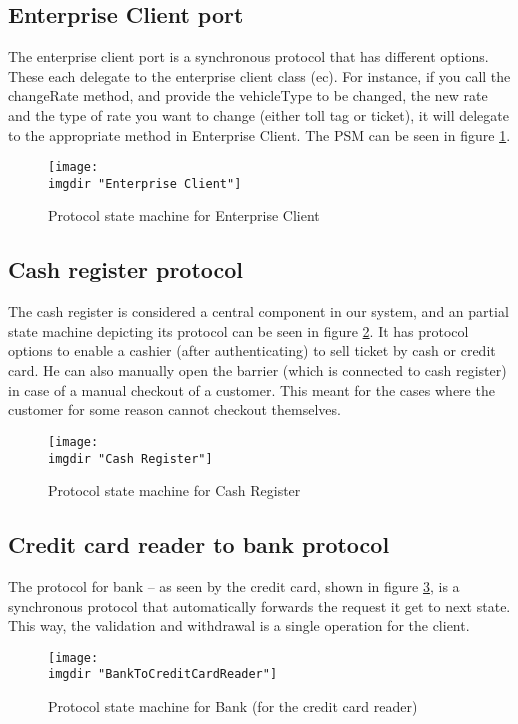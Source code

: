 \subsection{Enterprise Client port}
The enterprise client port is a synchronous protocol that has different options. These each delegate to the enterprise client class (ec). For instance, if you call the changeRate method, and provide the vehicleType to be changed, the new rate and the type of rate you want to change (either toll tag or ticket), it will delegate to the appropriate method in Enterprise Client. The PSM can be seen in figure \ref{fig:psm:enterprise_client}.
\begin{figure}
  \centering
  \texttt{[image: \\imgdir "Enterprise Client"]}
  \caption{Protocol state machine for Enterprise Client}
  \label{fig:psm:enterprise_client}
\end{figure}

\subsection{Cash register protocol}
The cash register is considered a central component in our system, and an partial state machine depicting its protocol can be seen in figure \ref{fig:psm:cash_register}. It has protocol options to enable a cashier (after authenticating) to sell ticket by cash or credit card. He can also manually open the barrier (which is connected to cash register) in case of a manual checkout of a customer. This meant for the cases where the customer for some reason cannot checkout themselves.
\begin{figure}
  \centering
  \texttt{[image: \\imgdir "Cash Register"]}
  \caption{Protocol state machine for Cash Register}
  \label{fig:psm:cash_register}
\end{figure}

\subsection{Credit card reader to bank protocol}
The protocol for bank -- as seen by the credit card, shown in figure \ref{fig:psm:ccr_to_bank}, is a synchronous protocol that automatically forwards the request it get to next state. This way, the validation and withdrawal is a single operation for the client.
\begin{figure}
  \centering
  \texttt{[image: \\imgdir "BankToCreditCardReader"]}
  \caption{Protocol state machine for Bank (for the credit card reader)}
  \label{fig:psm:ccr_to_bank}
\end{figure}
